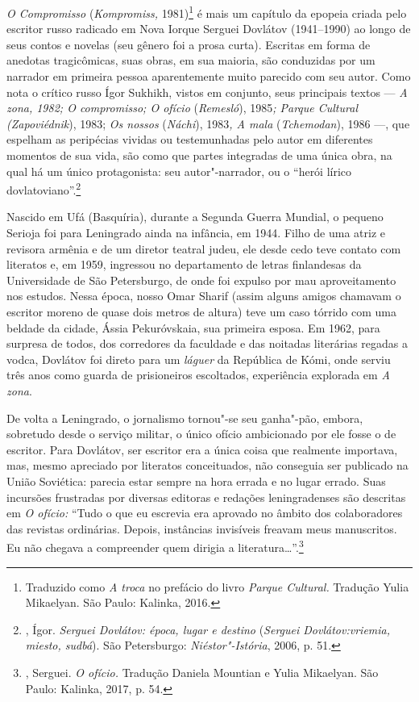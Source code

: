 \movetoevenpage
\pagebreak
\begin{center}
{}
\end{center}
\label{posfacio}

\bigskip

\emph{O Compromisso} (\emph{Kompromiss,} 1981)\footnote{Traduzido como
  \emph{A troca} no prefácio do livro \emph{Parque Cultural.} Tradução
  Yulia Mikaelyan. São Paulo: Kalinka, 2016.} é mais um capítulo da
epopeia criada pelo escritor russo radicado em Nova Iorque Serguei
Dovlátov (1941--1990) ao longo de seus contos e novelas (seu gênero foi
a prosa curta). Escritas em forma de anedotas tragicômicas, suas obras,
em sua maioria, são conduzidas por um narrador em primeira pessoa
aparentemente muito parecido com seu autor. Como nota o crítico russo
Ígor Sukhikh, vistos em conjunto, seus principais textos --- \emph{A
zona, 1982; O compromisso; O ofício} (\emph{Remesló}),
1985\emph{; Parque Cultural (Zapoviédnik}), 1983; \emph{Os
nossos} (\emph{Náchi}), 1983\emph{, A mala}
(\emph{Tchemodan}), 1986 ---, que espelham as peripécias vividas
ou testemunhadas pelo autor em diferentes momentos de sua vida, são como
que partes integradas de uma única obra, na qual há um único
protagonista: seu autor"-narrador, ou o ``herói lírico
dovlatoviano''.\footnote{, Ígor. \emph{Serguei Dovlátov: época,
  lugar e destino} (\emph{Serguei Dovlátov:vriemia, miesto, sudbá}). São
  Petersburgo: \emph{Niéstor"-Istória}, 2006, p. 51.}

Nascido em Ufá (Basquíria), durante a Segunda Guerra Mundial, o pequeno
Serioja foi para Leningrado ainda na infância, em 1944. Filho de uma
atriz e revisora armênia e de um diretor teatral judeu, ele desde cedo
teve contato com literatos e, em 1959, ingressou no departamento de
letras finlandesas da Universidade de São Petersburgo, de onde foi
expulso por mau aproveitamento nos estudos. Nessa época, nosso Omar
Sharif (assim alguns amigos chamavam o escritor moreno de quase dois
metros de altura) teve um caso tórrido com uma beldade da cidade, Ássia
Pekuróvskaia, sua primeira esposa. Em 1962, para surpresa de todos, dos
corredores da faculdade e das noitadas literárias regadas a vodca,
Dovlátov foi direto para um \emph{láguer} da República de Kómi, onde
serviu três anos como guarda de prisioneiros escoltados, experiência
explorada em \emph{A zona}.

De volta a Leningrado, o jornalismo tornou"-se seu ganha"-pão, embora,
sobretudo desde o serviço militar, o único ofício ambicionado por ele
fosse o de escritor. Para Dovlátov, ser escritor era a única coisa que
realmente importava, mas, mesmo apreciado por literatos conceituados,
não conseguia ser publicado na União Soviética: parecia estar sempre na
hora errada e no lugar errado. Suas incursões frustradas por diversas
editoras e redações leningradenses são descritas em \emph{O ofício:}
``Tudo o que eu escrevia era aprovado no âmbito dos colaboradores das
revistas ordinárias. Depois, instâncias invi­síveis freavam meus
manuscritos. Eu não chegava a compreen­der quem dirigia a
literatura\ldots{}''.\footnote{, Serguei. \emph{O ofício.} Tradução
  Daniela Mountian e Yulia Mikaelyan. São Paulo: Kalinka, 2017, p. 54.}

